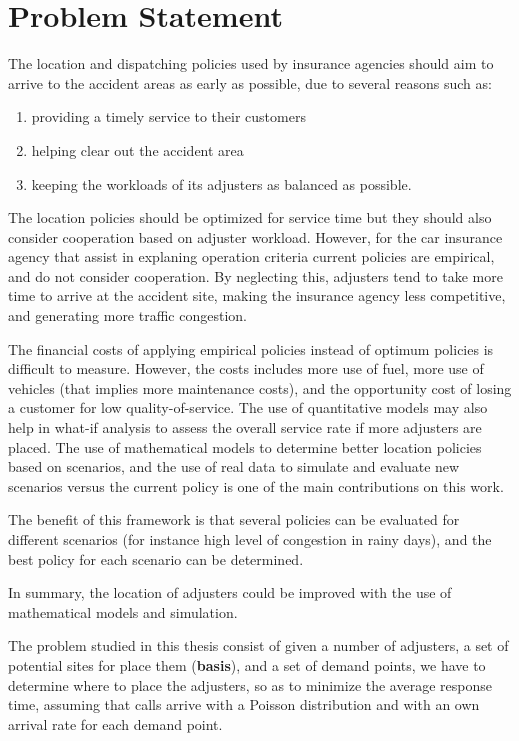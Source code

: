 \section{Problem Statement}

The location and dispatching policies
used by insurance agencies
should aim
to arrive to the accident areas
as early as possible,
due to several reasons
such as:
\begin{enumerate}
\item providing a timely service to their customers
\item helping clear out the accident area
\item keeping the workloads of its adjusters
  as balanced as possible.
\end{enumerate}
The location policies
should be optimized for service time
but they should also consider
cooperation based on adjuster workload.
However,
for the car insurance agency
that assist in explaning operation criteria
current policies
are empirical,
and do not consider cooperation.
By neglecting this,
adjusters tend to take
more time to arrive at the accident site,
making the insurance agency
less competitive,
and generating more traffic congestion.

The financial costs
of applying
empirical policies
instead of optimum policies
is difficult to measure.
However,
the costs includes
more use of fuel,
more use of vehicles
(that implies
more maintenance costs),
and the opportunity cost
of losing a customer
for low quality-of-service.
The use of quantitative models
may also help
in what-if analysis
to assess the overall service rate
if more adjusters are placed.
The use of mathematical models
to determine better location policies
based on scenarios,
and the use of real data
to simulate and evaluate new scenarios
versus the current policy
is one of the main contributions
on this work.

The benefit of this framework
is that several policies
can be evaluated for different scenarios
(for instance high level of congestion in rainy days),
and the best policy for each scenario can be determined.

In summary,
the location of adjusters
could be improved
with the use of
mathematical models and simulation.

The problem studied in this thesis
consist of
given a number of adjusters,
a set of potential sites for place them (\textbf{basis}),
and a set of demand points,
we have to determine
where to place the adjusters,
so as to minimize 
the average response time,
assuming
that calls
arrive with a Poisson distribution
and with an own arrival rate
for each demand point.

